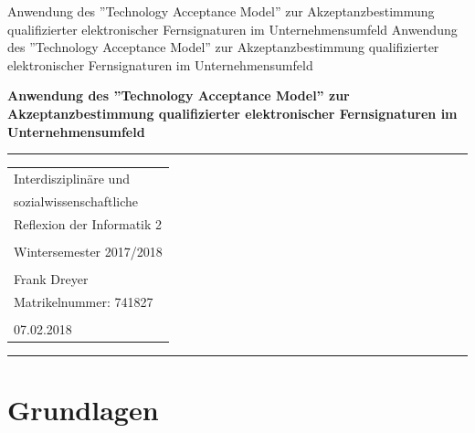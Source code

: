 \documentclass[deutsch]{lib/llncs/llncs}
\begin{document}
\markboth
{Anwendung des ''Technology Acceptance Model'' zur Akzeptanzbestimmung qualifizierter elektronischer  Fernsignaturen im Unternehmensumfeld}
{Anwendung des ''Technology Acceptance Model'' zur Akzeptanzbestimmung qualifizierter elektronischer  Fernsignaturen im Unternehmensumfeld}
\thispagestyle{empty}


\begin{flushleft}
\LARGE\bfseries Anwendung des ''Technology Acceptance Model'' zur Akzeptanzbestimmung qualifizierter elektronischer  Fernsignaturen im Unternehmensumfeld


\end{flushleft}
\rule{\textwidth}{1pt}
\vspace{2pt}


\begin{flushright}
\Huge


\begin{tabular}{@{}l}
Interdisziplinäre und \\
sozialwissenschaftliche \\
Reflexion der Informatik 2\\\\
Wintersemester 2017/2018\\\\
Frank Dreyer\\
Matrikelnummer: 741827\\\\
07.02.2018\\[6pt]
\end{tabular}


\end{flushright}
\rule{\textwidth}{1pt}
\vfill

\newpage
\tableofcontents
\newpage\vspace{2pt}


\section{Grundlagen}
\end{document}

